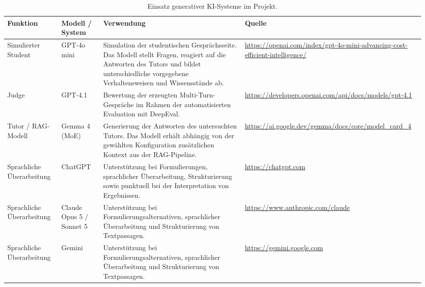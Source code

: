 \documentclass[
    12pt,
    a4paper
]{article}
\begin{document}
\begin{table}[htbp]
    \centering
    \caption{Einsatz generativer KI-Systeme im Projekt.}
    \label{tab:ki_einsatz}
    \renewcommand{\arraystretch}{1.25}
 
    \begin{tabularx}{\linewidth}{
        @{}
>{\raggedright\arraybackslash}p{2.6cm}
>{\raggedright\arraybackslash}p{3.0cm}
>{\raggedright\arraybackslash}X
>{\raggedright\arraybackslash}p{2.2cm}
        @{}
    }
        \toprule
        \textbf{Funktion} &
        \textbf{Modell / System} &
        \textbf{Verwendung} &
        \textbf{Quelle} \\
        \midrule
 
        Simulierter Student &
        GPT-4o mini &
        Simulation der studentischen Gesprächsseite. Das Modell stellt Fragen, reagiert auf die Antworten des Tutors und bildet unterschiedliche vorgegebene Verhaltensweisen und Wissensstände ab. &
        \url{https://openai.com/index/gpt-4o-mini-advancing-cost-efficient-intelligence/} \\[0.4em]
 
        Judge &
        GPT-4.1 &
        Bewertung der erzeugten Multi-Turn-Gespräche im Rahmen der automatisierten Evaluation mit DeepEval. &
        \url{https://developers.openai.com/api/docs/models/gpt-4.1} \\[0.4em]
 
        Tutor / RAG-Modell &
        Gemma 4 (MoE) &
        Generierung der Antworten des untersuchten Tutors. Das Modell erhält abhängig von der gewählten Konfiguration zusätzlichen Kontext aus der RAG-Pipeline. &
        \url{https://ai.google.dev/gemma/docs/core/model_card_4} \\[0.4em]
 
        Sprachliche Überarbeitung &
        ChatGPT &
        Unterstützung bei Formulierungen, sprachlicher Überarbeitung, Strukturierung sowie punktuell bei der Interpretation von Ergebnissen. &
        \url{https://chatgpt.com} \\[0.4em]
 
        Sprachliche Überarbeitung &
        Claude Opus 5 / Sonnet 5 &
        Unterstützung bei Formulierungsalternativen, sprachlicher Überarbeitung und Strukturierung von Textpassagen. &
        \url{https://www.anthropic.com/claude} \\[0.4em]
 
        Sprachliche Überarbeitung &
        Gemini &
        Unterstützung bei Formulierungsalternativen, sprachlicher Überarbeitung und Strukturierung von Textpassagen. &
        \url{https://gemini.google.com} \\
 
        \bottomrule
    \end{tabularx}
\end{table}
\newpage
\appendix
\end{document}

